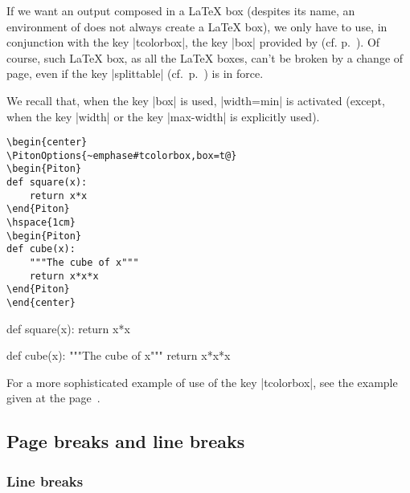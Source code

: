 \documentclass{article}
\begin{document}
\bigskip
If we want an output composed in a LaTeX box (despites its name, an environment
of  does not always create a LaTeX box), we only have to use,
in conjunction with the key |tcolorbox|, the key |box| provided by 
(cf. p.~\pageref{box}). Of course, such LaTeX box, as all the LaTeX boxes, can't
be broken by a change of page, even if the key |splittable| (cf.~p.~\pageref{splittable})
is in force.

We recall that, when the key |box| is used, |width=min| is activated (except,
when the key |width| or the key |max-width| is explicitly used).


\smallskip
\begin{Verbatim}
\begin{center}
\PitonOptions{~emphase#tcolorbox,box=t@}
\begin{Piton}
def square(x):
    return x*x
\end{Piton}
\hspace{1cm}
\begin{Piton}
def cube(x):
    """The cube of x"""
    return x*x*x
\end{Piton}
\end{center}
\end{Verbatim}

\begin{center}
%
\begin{Piton}
def square(x):
    return x*x
\end{Piton}
\hspace{1cm}
\begin{Piton}
def cube(x):
    """The cube of x"""
    return x*x*x
\end{Piton}
\end{center}



\bigskip
For a more sophisticated example of use of the key |tcolorbox|, see the example
given at the page~\pageref{examples-tcolorbox}.



\bigskip
\subsection{Page breaks and line breaks}

\label{breakable}

\subsubsection{Line breaks}
\end{document}
